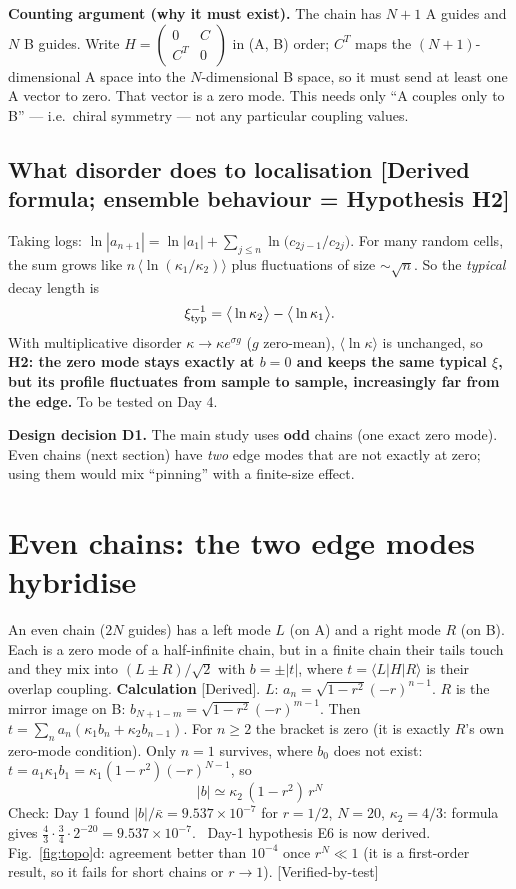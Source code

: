 \documentclass[10pt,a4paper]{article}
\newcommand{\ka}{\kappa_1}
\newcommand{\kc}{\kappa_2}
\newcommand{\note}[1]{\par\smallskip\noindent\colorbox{gray!12}{\parbox{\dimexpr\linewidth-2\fboxsep}{\small #1}}\par\smallskip}
\newcommand{\evd}[1]{\textsf{\small[#1]}}
\begin{document}
\textbf{Counting argument (why it must exist).} The chain has $N+1$ A guides and $N$ B guides. Write $H=\begin{pmatrix}0&C\\C^T&0\end{pmatrix}$ in (A, B) order; $C^T$ maps the $(N+1)$-dimensional A space into the $N$-dimensional B space, so it must send at least one A vector to zero. That vector is a zero mode. This needs only ``A couples only to B'' --- i.e.\ chiral symmetry --- not any particular coupling values.

\subsection{What disorder does to localisation \evd{Derived formula; ensemble behaviour = Hypothesis H2}}
Taking logs: $\ln|a_{n+1}|=\ln|a_1|+\sum_{j\le n}\ln\!\big(c_{2j-1}/c_{2j}\big)$. For many random cells, the sum grows like $n\,\langle\ln(\kappa_1/\kappa_2)\rangle$ plus fluctuations of size $\sim\sqrt n$. So the \emph{typical} decay length is
\[
\xi_{\rm typ}^{-1}=\big\langle\ln\kappa_2\big\rangle-\big\langle\ln\kappa_1\big\rangle .
\]
With multiplicative disorder $\kappa\to\kappa e^{\sigma g}$ ($g$ zero-mean), $\langle\ln\kappa\rangle$ is unchanged, so \textbf{H2: the zero mode stays exactly at $b=0$ and keeps the same typical $\xi$, but its profile fluctuates from sample to sample, increasingly far from the edge.} To be tested on Day 4.

\note{\textbf{Design decision D1.} The main study uses \textbf{odd} chains (one exact zero mode). Even chains (next section) have \emph{two} edge modes that are not exactly at zero; using them would mix ``pinning'' with a finite-size effect.}

\section{Even chains: the two edge modes hybridise}
An even chain ($2N$ guides) has a left mode $L$ (on A) and a right mode $R$ (on B). Each is a zero mode of a half-infinite chain, but in a finite chain their tails touch and they mix into $(L\pm R)/\sqrt2$ with $b=\pm|t|$, where $t=\langle L|H|R\rangle$ is their overlap coupling.
\textbf{Calculation} \evd{Derived}. $L$: $a_n=\sqrt{1-r^2}(-r)^{n-1}$. $R$ is the mirror image on B: $b_{N+1-m}=\sqrt{1-r^2}(-r)^{m-1}$. Then $t=\sum_n a_n(\ka b_n+\kc b_{n-1})$. For $n\ge2$ the bracket is zero (it is exactly $R$'s own zero-mode condition). Only $n=1$ survives, where $b_0$ does not exist: $t=a_1\ka b_1=\ka(1-r^2)(-r)^{N-1}$, so
\[
\boxed{\ |b|\simeq\kc\,(1-r^2)\,r^{N}\ }
\]
Check: Day 1 found $|b|/\bar\kappa=9.537\times10^{-7}$ for $r=1/2$, $N=20$, $\kc=4/3$: formula gives $\tfrac43\cdot\tfrac34\cdot2^{-20}=9.537\times10^{-7}$. \checkmark\ Day-1 hypothesis E6 is now derived. Fig.~\ref{fig:topo}d: agreement better than $10^{-4}$ once $r^N\ll1$ (it is a first-order result, so it fails for short chains or $r\to1$). \evd{Verified-by-test}
\end{document}
